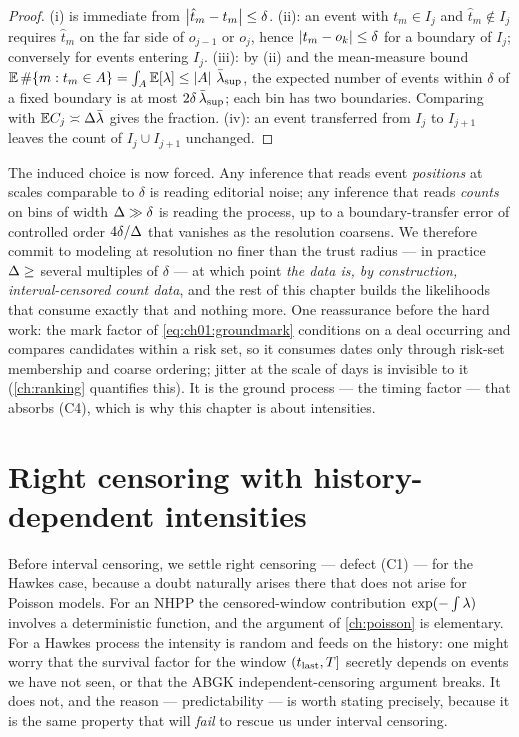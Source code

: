 \begin{proof}
(i) is immediate from $\left|\hat t_m - t_m\right|\le\delta$. (ii): an event with
$t_m \in I_j$ and $\hat t_m \notin I_j$ requires $\hat t_m$ on the far side
of $o_{j-1}$ or $o_j$, hence $\left|t_m - o_k\right|\le\delta$ for a boundary of
$I_j$; conversely for events entering $I_j$. (iii): by (ii) and the mean-measure
bound $\mathbb{E}\,\#\{m: t_m \in A\} = \int_A \mathbb{E}[\lambda] \le
\left|A\right|\,\bar{\lambda}_{\sup}$, the expected number of events within $\delta$ of
a fixed boundary is at most $2\delta\,\bar{\lambda}_{\sup}$; each bin has two
boundaries. Comparing with $\mathbb{E} C_j \asymp \Delta\bar{\lambda}$ gives
the fraction. (iv): an event transferred from $I_j$ to $I_{j+1}$ leaves the
count of $I_j \cup I_{j+1}$ unchanged.
\end{proof}

The induced choice is now forced. Any inference that reads event
\emph{positions} at scales comparable to $\delta$ is reading editorial
noise; any inference that reads \emph{counts} on bins of width
$\Delta \gg \delta$ is reading the process, up to a boundary-transfer
error of controlled order $4\delta/\Delta$ that vanishes as the resolution
coarsens. We therefore commit to modeling at resolution no finer than the
trust radius --- in practice $\Delta \ge$ several multiples of $\delta$ ---
at which point \emph{the data is, by construction, interval-censored count
data}, and the rest of this chapter builds the likelihoods that consume
exactly that and nothing more. One reassurance before the hard work: the
mark factor of \cref{eq:ch01:groundmark} conditions on a deal occurring and
compares candidates within a risk set, so it consumes dates only through
risk-set membership and coarse ordering; jitter at the scale of days is
invisible to it (\cref{ch:ranking} quantifies this). It is the ground
process --- the timing factor --- that absorbs (C4), which is why this
chapter is about intensities.

\section{Right censoring with history-dependent intensities}\label{ch06:sec:rightcens}

Before interval censoring, we settle right censoring --- defect (C1) --- for
the Hawkes case, because a doubt naturally arises there that does not arise
for Poisson models. For an NHPP the censored-window contribution
$\exp(-\int\lambda)$ involves a deterministic function, and the argument of
\cref{ch:poisson} is elementary. For a Hawkes process the intensity is
random and feeds on the history: one might worry that the survival factor
for the window $(t_{\text{last}}, T]$ secretly depends on events we have
not seen, or that the ABGK independent-censoring argument breaks. It does
not, and the reason --- predictability --- is worth stating precisely,
because it is the same property that will \emph{fail} to rescue us under
interval censoring.

